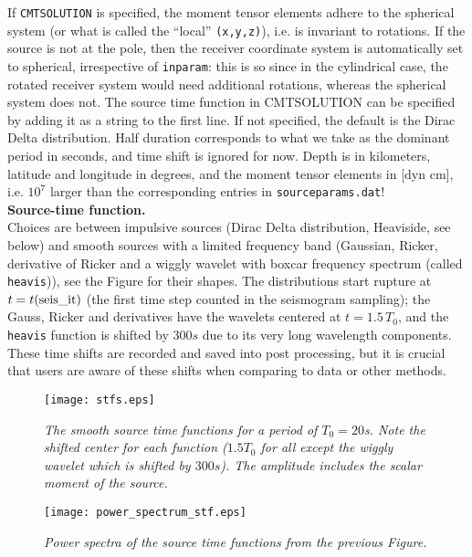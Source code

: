 \documentclass[11pt,letter,fleqn,english,notitlepage]{article}
\begin{document}
\noindent If {\tt CMTSOLUTION} is specified, the moment tensor elements adhere to the spherical system 
(or what is called the ``local'' {\tt (x,y,z)}), i.e. is invariant to rotations. 
If the source is not at the pole, then the receiver coordinate system is automatically set to spherical, irrespective of {\tt inparam}:
this is so since in the cylindrical case, the rotated receiver system would need additional rotations, 
whereas the spherical system does not. The source time function in CMTSOLUTION can be specified by adding it as a string 
to the first line. If not specified, the default is the Dirac Delta distribution. Half duration corresponds to what we take 
as the dominant period in seconds, and time shift is ignored for now.
Depth is in kilometers, latitude and longitude in degrees, and the
moment tensor elements in [dyn cm], i.e. $10^7$ larger than the corresponding entries in {\tt sourceparams.dat}! \\

\noindent \textbf{Source-time function.}\\
%
\noindent 
Choices are between impulsive sources (Dirac Delta distribution,
Heaviside, see below) and smooth sources with a limited frequency band (Gaussian, Ricker,
derivative of Ricker and a wiggly wavelet with boxcar frequency 
spectrum (called {\tt heavis})), see the Figure for their shapes. 
The distributions start rupture at $t=t({\rm seis\_it})$ (the first time step counted in the seismogram 
sampling); the Gauss, Ricker and derivatives have the wavelets
centered at $t=1.5 \,T_0$, and the {\tt heavis} function is shifted by $300 s$ due to its very long wavelength components. These time 
shifts are recorded and saved into post processing, but it is crucial that users are aware of these shifts when comparing to 
data or other methods. \\
\begin{figure*}[htb]
\begin{center}
\texttt{[image: stfs.eps]}
\caption{\textit{The smooth source time functions for a period of $T_0=20$s. Note the shifted center for each function 
($1.5 T_0$ for all except the wiggly wavelet which is shifted by $300s$). The amplitude includes the scalar moment of the source. }}
\end{center}
\end{figure*}

\begin{figure*}[htb]
\begin{center}
\texttt{[image: power\_spectrum\_stf.eps]}
\caption{\textit{Power spectra of the source time functions from the previous Figure.}}
\end{center}
\end{figure*}
\end{document}
